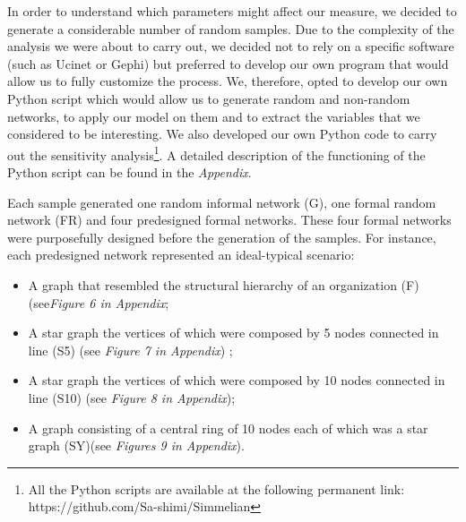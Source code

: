 \documentclass{article}
\begin{document}
In order to understand which parameters might affect our measure, we decided to generate a considerable number of random samples. Due to the complexity of the analysis we were about to carry out, we decided not to rely on a specific software (such as Ucinet or Gephi) but preferred to develop our own program that would allow us to fully customize the process. We, therefore, opted to develop our own Python script which would allow us to generate random and non-random networks, to apply our model on them and to extract the variables that we considered to be interesting. We also developed our own Python code to carry out the sensitivity analysis\footnote{All the Python scripts are available at the following permanent link: https://github.com/Sa-shimi/Simmelian}. A detailed description of the functioning of the Python script can be found in the \emph{Appendix}.

Each sample generated one random informal network (G), one formal random network (FR) and four predesigned formal networks. These four formal networks were purposefully designed before the generation of the samples. For instance, each predesigned network represented an ideal-typical scenario:
\begin{itemize}
	\item A graph that resembled the structural hierarchy of an organization (F) (see\emph{Figure 6 in Appendix};
	\item A star graph the vertices of which were composed by 5 nodes connected in line (S5) (see \emph{Figure 7 in Appendix}) ;
	\item A star graph the vertices of which were composed by 10 nodes connected in line (S10) (see \emph{Figure 8 in Appendix});
	\item A graph consisting of a central ring of 10 nodes each of which was a star graph (SY)(see \emph{Figures 9 in Appendix}).
\end{itemize}
\end{document}
